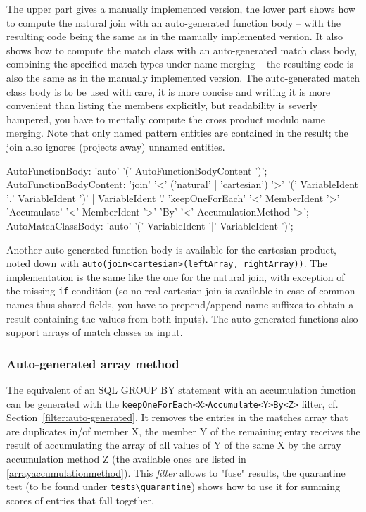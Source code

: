 The upper part gives a manually implemented version, the lower part shows how to compute the natural join with an auto-generated function body -- with the resulting code being the same as in the manually implemented version.
It also shows how to compute the match class with an auto-generated match class body, combining the specified match types under name merging -- the resulting code is also the same as in the manually implemented version.
The auto-generated match class body is to be used with care, it is more concise and writing it is more convenient than listing the members explicitly, but readability is severly hampered, you have to mentally compute the cross product modulo name merging.
Note that only named pattern entities are contained in the result; the join also ignores (projects away) unnamed entities.

\begin{rail}
  AutoFunctionBody: 'auto' '(' AutoFunctionBodyContent ')';
  AutoFunctionBodyContent: 'join' '<' ('natural' | 'cartesian') '>' '(' VariableIdent ',' VariableIdent ')' | VariableIdent '.' 'keepOneForEach' '<' MemberIdent '>' \\ 'Accumulate' '<' MemberIdent '>' 'By' '<' AccumulationMethod '>';
  AutoMatchClassBody: 'auto' '(' VariableIdent '|' VariableIdent ')';
\end{rail}

Another auto-generated function body is available for the cartesian product, noted down with \texttt{auto(join<cartesian>(leftArray, rightArray))}.
The implementation is the same like the one for the natural join, with exception of the missing \texttt{if} condition (so no real cartesian join is available in case of common names thus shared fields, you have to prepend/append name suffixes to obtain a result containing the values from both inputs).
The auto generated functions also support arrays of match classes as input.

\subsubsection*{Auto-generated array method}

The equivalent of an SQL GROUP BY statement with an accumulation function can be generated with the \texttt{keepOneForEach<X>Accumulate<Y>By<Z>} filter, cf. Section~\ref{filter:auto-generated}.
It removes the entries in the matches array that are duplicates in/of member X, the member Y of the remaining entry receives the result of accumulating the array of all values of Y of the same X by the array accumulation method Z (the available ones are listed in \ref{arrayaccumulationmethod}).
This \emph{filter} allows to "fuse" results, the quarantine test (to be found under \verb#tests\quarantine#) shows how to use it for summing scores of entries that fall together.

